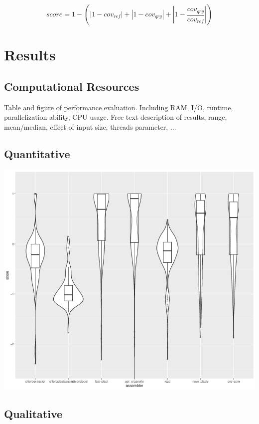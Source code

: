 \documentclass{bmcart}
\begin{document}
\[ score = 1 - ( |1- cov_{ref}| +  |1- cov_{qry}| + |1- \frac{cov_{qry}}{cov_{ref}}| ) \]




\section*{Results}
\subsection*{Computational Resources}
Table and figure of performance evaluation. Including RAM, I/O, runtime, parallelization ability, CPU usage. Free text description of results, range, mean/median, effect of input size, threads parameter, ...
\subsection*{Quantitative}

\includegraphics{Violin.png}

\subsection*{Qualitative}
\end{document}
